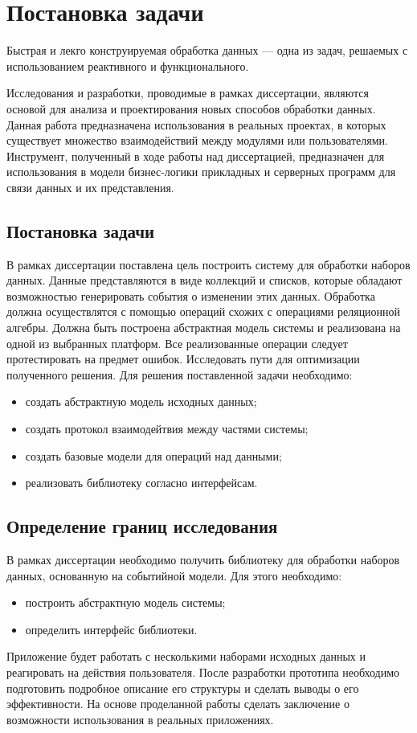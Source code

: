 \chapter{Постановка задачи}
\label{sec:practice:planning}

Быстрая и лекго конструируемая обработка данных --- одна из задач, решаемых с использованием реактивного и функционального.

Исследования и разработки, проводимые в рамках диссертации, являются основой для анализа и проектирования новых способов обработки данных.
Данная работа предназначена использования в реальных проектах, в которых существует множество взаимодействий между модулями или пользователями.
Инструмент, полученный в ходе работы над диссертацией, предназначен для использования в модели бизнес-логики прикладных
и серверных программ для связи данных и их представления.

\section{Постановка задачи}
\label{sub:practice:task_planning}

В рамках диссертации поставлена цель построить систему для обработки наборов данных.
Данные представляются в виде коллекций и списков, которые обладают возможностью генерировать события о изменении этих данных.
Обработка должна осуществлятся с помощью операций схожих с операциями реляционной алгебры.
Должна быть построена абстрактная модель системы и реализована на одной из выбранных платформ.
Все реализованные операции следует протестировать на предмет ошибок.
Исследовать пути для оптимизации полученного решения.
Для решения поставленной задачи необходимо:
\begin{itemize}
  \item создать абстрактную модель исходных данных;
  \item создать протокол взаимодейтвия между частями системы;
  \item создать базовые модели для операций над данными;
  \item	реализовать библиотеку согласно интерфейсам.
\end{itemize}

\section{Определение границ исследования}
\label{sub:practice:task_milestone}

В рамках диссертации необходимо получить библиотеку для обработки наборов данных, основанную на событийной модели.
Для этого необходимо:
\begin{itemize}
  \item построить абстрактную модель системы;
  \item определить интерфейс библиотеки.
\end{itemize}

Приложение будет работать с несколькими наборами исходных данных и реагировать на действия пользователя.
После разработки прототипа необходимо подготовить подробное описание его структуры и сделать выводы о его эффективности.
На основе проделанной работы сделать заключение о возможности использования в реальных приложениях.
